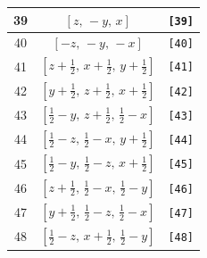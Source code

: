 \documentclass[fleqn,8pt]{jsarticle}
\begin{document}
\begin{longtable}{ccc}
39 & $\left[ z,\, - y,\, x \right]$ & {\tt [39]} \\ \hline
40 & $\left[ - z,\, - y,\, - x \right]$ & {\tt [40]} \\ \hline
41 & $\left[ z + \frac{1}{2},\, x + \frac{1}{2},\, y + \frac{1}{2} \right]$ & {\tt [41]} \\ \hline
42 & $\left[ y + \frac{1}{2},\, z + \frac{1}{2},\, x + \frac{1}{2} \right]$ & {\tt [42]} \\ \hline
43 & $\left[ \frac{1}{2} - y,\, z + \frac{1}{2},\, \frac{1}{2} - x \right]$ & {\tt [43]} \\ \hline
44 & $\left[ \frac{1}{2} - z,\, \frac{1}{2} - x,\, y + \frac{1}{2} \right]$ & {\tt [44]} \\ \hline
45 & $\left[ \frac{1}{2} - y,\, \frac{1}{2} - z,\, x + \frac{1}{2} \right]$ & {\tt [45]} \\ \hline
46 & $\left[ z + \frac{1}{2},\, \frac{1}{2} - x,\, \frac{1}{2} - y \right]$ & {\tt [46]} \\ \hline
47 & $\left[ y + \frac{1}{2},\, \frac{1}{2} - z,\, \frac{1}{2} - x \right]$ & {\tt [47]} \\ \hline
48 & $\left[ \frac{1}{2} - z,\, x + \frac{1}{2},\, \frac{1}{2} - y \right]$ & {\tt [48]} \\
\end{longtable}
\end{document}

